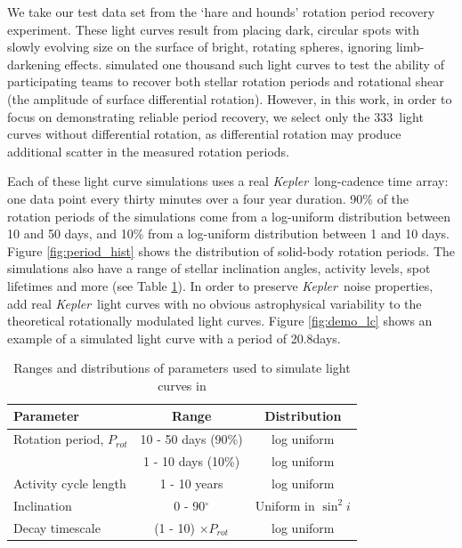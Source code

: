 \documentclass[a4paper,fleqn,usenatbib,useAMS]{mnras}
\newcommand{\Kepler}{{\it Kepler}}
\newcommand{\kepler}{\Kepler}
\newcommand{\naigrain}{333}
\newcommand{\aigrainexampleperiod}{20.8}
\begin{document}
We take our test data set from the \citet{Aigrain2015} `hare and hounds'
rotation period recovery experiment.
These light curves result from placing dark, circular spots with slowly
evolving size on the surface of bright, rotating spheres, ignoring
limb-darkening effects.
\citet{Aigrain2015} simulated one thousand such light curves to test the
ability of participating teams to recover both stellar rotation periods
and rotational shear (the amplitude of surface differential rotation).
However, in this work, in order to focus on demonstrating reliable period recovery,
we select only the \naigrain\ light curves without differential rotation,
as differential rotation may produce additional scatter in the
measured rotation periods.

Each of these light curve simulations uses a real \Kepler\ long-cadence time array:
one data point every thirty minutes over a four year duration.
90\% of the rotation periods of the simulations come from a
log-uniform distribution between 10 and 50 days, and 10\% from a log-uniform
distribution between 1 and 10 days.
Figure \ref{fig:period_hist} shows the distribution of solid-body rotation periods.
The simulations also have a range of stellar inclination
angles, activity levels, spot lifetimes and more
(see Table \ref{tab:simulation_parameters}).
In order to preserve \kepler\ noise properties,
\citet{Aigrain2015} add real \kepler\ light curves with no obvious astrophysical
variability to the theoretical rotationally modulated light curves.
Figure \ref{fig:demo_lc} shows an example of a simulated light curve with a
period of \aigrainexampleperiod days.

\begin{table}
\begin{center}
\caption{\label{tab:simulation_parameters} Ranges and distributions of
    parameters used to simulate light curves in \citet{Aigrain2015}}
\begin{tabular}{lcc}
\hline\hline
    Parameter & Range & Distribution \\
    \hline
    Rotation period, $P_{rot}$ & 10 - 50 days (90\%) & log uniform \\
    & 1 - 10 days (10\%) & log uniform \\
    Activity cycle length & 1 - 10 years & log uniform \\
    Inclination & 0 - 90$^\circ$ & Uniform in $\sin^2i$ \\
    Decay timescale & (1 - 10) $\times P_{rot}$ & log uniform \\
\hline
\end{tabular}
\end{center}
\end{table}
\end{document}
